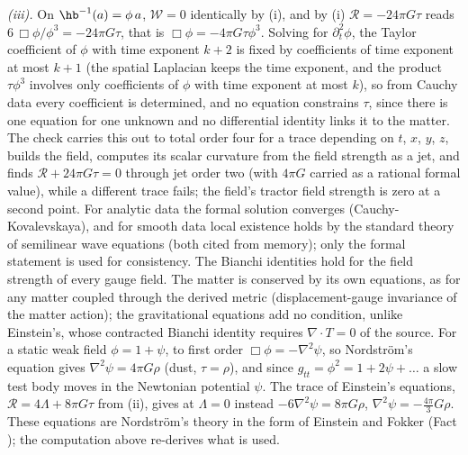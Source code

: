 \emph{(iii).} On $\hb^{-1}(a) = \phi\,a$, $\mathcal{W} = 0$ identically by (i), and by (i) $\mathcal{R} = -24\pi G\tau$ reads $6\,\Box\phi/\phi^{3} = -24\pi G\tau$, that is $\Box\phi = -4\pi G\tau\phi^{3}$. Solving for $\partial_{t}^{2}\phi$, the Taylor coefficient of $\phi$ with time exponent $k + 2$ is fixed by coefficients of time exponent at most $k + 1$ (the spatial Laplacian keeps the time exponent, and the product $\tau\phi^{3}$ involves only coefficients of $\phi$ with time exponent at most $k$), so from Cauchy data every coefficient is determined, and no equation constrains $\tau$, since there is one equation for one unknown and no differential identity links it to the matter. The check carries this out to total order four for a trace depending on $t$, $x$, $y$, $z$, builds the field, computes its scalar curvature from the field strength as a jet, and finds $\mathcal{R} + 24\pi G\tau = 0$ through jet order two (with $4\pi G$ carried as a rational formal value), while a different trace fails; the field's tractor field strength is zero at a second point. For analytic data the formal solution converges (Cauchy-Kovalevskaya), and for smooth data local existence holds by the standard theory of semilinear wave equations (both cited from memory); only the formal statement is used for consistency. The Bianchi identities hold for the field strength of every gauge field. The matter is conserved by its own equations, as for any matter coupled through the derived metric (displacement-gauge invariance of the matter action); the gravitational equations add no condition, unlike Einstein's, whose contracted Bianchi identity requires $\nabla \cdot T = 0$ of the source. For a static weak field $\phi = 1 + \psi$, to first order $\Box\phi = -\nabla^{2}\psi$, so Nordstr\"om's equation gives $\nabla^{2}\psi = 4\pi G\rho$ (dust, $\tau = \rho$), and since $g_{tt} = \phi^{2} = 1 + 2\psi + \dots$ a slow test body moves in the Newtonian potential $\psi$. The trace of Einstein's equations, $\mathcal{R} = 4\Lambda + 8\pi G\tau$ from (ii), gives at $\Lambda = 0$ instead $-6\nabla^{2}\psi = 8\pi G\rho$, $\nabla^{2}\psi = -\tfrac{4\pi}{3}G\rho$. These equations are Nordstr\"om's theory in the form of Einstein and Fokker (Fact ); the computation above re-derives what is used.

